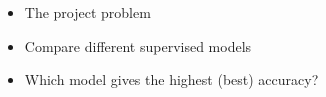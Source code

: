 \begin{itemize}
    \item The project problem
    \item Compare different supervised models
    \item Which model gives the highest (best) accuracy?
\end{itemize}